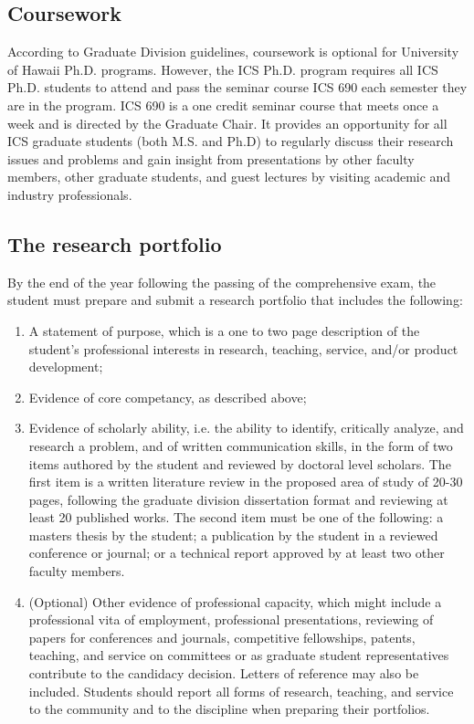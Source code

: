 \documentclass[12pt]{article}
\begin{document}
\subsection{Coursework}

According to Graduate Division guidelines, coursework is optional for
University of Hawaii Ph.D. programs.  However, the ICS Ph.D. program
requires all ICS Ph.D. students to attend and pass the seminar course ICS
690 each semester they are in the program.  ICS 690 is a one credit seminar
course that meets once a week and is directed by the Graduate Chair. It
provides an opportunity for all ICS graduate students (both M.S. and Ph.D)
to regularly discuss their research issues and problems and gain insight
from presentations by other faculty members, other graduate students, and
guest lectures by visiting academic and industry professionals.  

\subsection{The research portfolio}

By the end of the year following the passing of the comprehensive exam, the student
must prepare and submit a research portfolio that includes the following:

\begin{enumerate}
\item A statement of purpose, which is a one to two page description of the
  student's professional interests in research, teaching, service, and/or
  product development;
\item Evidence of core competancy, as described above;
\item Evidence of scholarly ability, i.e. the ability to identify,
  critically analyze, and research a problem, and of written communication
  skills, in the form of two items authored by the student and reviewed by
  doctoral level scholars. The first item is a written literature review in
  the proposed area of study of 20-30 pages, following the graduate
  division dissertation format and reviewing at least 20 published
  works. The second item must be one of the following:  a masters thesis by
  the student; a publication by the student in a reviewed conference or
  journal; or a technical report approved by at least two other faculty
  members. 
\item (Optional) Other evidence of professional capacity, which might
  include a professional vita of employment, professional presentations, reviewing of papers for conferences and journals, competitive fellowships, patents, teaching, and service on committees or as graduate student representatives contribute to the candidacy decision. Letters of reference may also be included. Students should report all forms of research, teaching, and service to the community and to the discipline when preparing their portfolios.
\end{enumerate}
\end{document}
